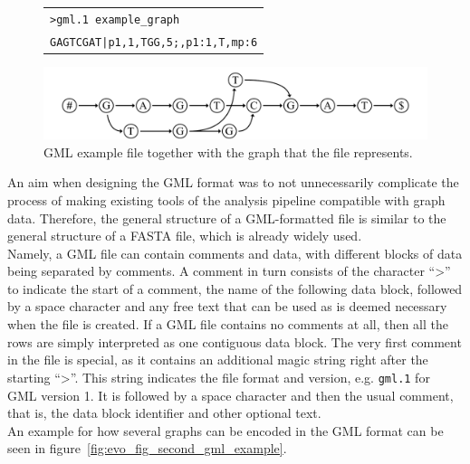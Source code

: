 \documentclass[a4paper,12pt,twoside,BCOR=10mm]{scrbook}
\begin{document}
\begin{figure}[!htb]
\centering
\begin{tabularx}{1.0\textwidth}{ | X | }
\hline
\texttt{>gml.1 example\_graph} \\
\texttt{GAGTCGAT|p1,1,TGG,5;,p1:1,T,mp:6} \\
\hline
\end{tabularx}
\includegraphics[width=\textwidth]{evo_fig_first_gml_example.pdf}
\caption[GML example file]{GML example file together with the graph that the file represents.} \label{fig:evo_fig_first_gml_example}
\end{figure}

An aim when designing the GML format was to not unnecessarily complicate the process of
making existing tools of the analysis pipeline
compatible with graph data.
Therefore, the general structure of a GML-formatted file is similar to the general structure
of a FASTA file, which is already widely used. \\
Namely, a GML file can contain comments and data, with different blocks of data being separated
by comments. A comment in turn consists of the character “>” to indicate the start of a comment,
the name of the following data block, followed by a space character and any free text that
can be used as is deemed necessary when the file is created.
If a GML file contains no comments at all,
then all the rows are simply interpreted as one contiguous data block.
The very first comment in the file is special,
as it contains an additional magic string right after the starting “>”.
This string indicates the
file format and version, e.g. \texttt{gml.1} for GML version 1.
It is followed by a space character and then the usual comment, that is, the data block identifier
and other optional text. \\
An example for how several graphs can be encoded in the GML format
can be seen in figure~\ref{fig:evo_fig_second_gml_example}.
\end{document}
